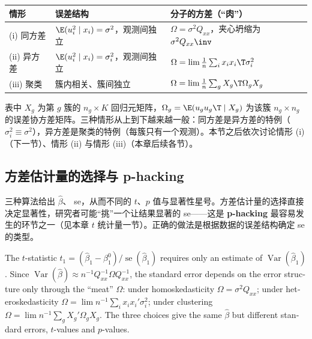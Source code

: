 \begin{center}
\small
\begin{tabularx}{\linewidth}{lLL}
\toprule
情形 & 误差结构 & 分子的方差（“肉”）\\
\midrule
(i) 同方差 & $\E(u_i^2\mid x_i)=\sigma^2$，观测间独立 & $\Omega=\sigma^2Q_{xx}$，夹心坍缩为 $\sigma^2Q_{xx}\inv$\\
(ii) 异方差 & $\E(u_i^2\mid x_i)=\sigma_i^2$，观测间独立 & $\Omega=\lim\frac1n\sum_i x_ix_i\T\sigma_i^2$\\
(iii) 聚类 & 簇内相关、簇间独立 & $\Omega=\lim\frac1n\sum_g X_g\T\Omega_gX_g$\\
\bottomrule
\end{tabularx}
\end{center}

表中 $X_g$ 为第 $g$ 簇的 $n_g\times K$ 回归元矩阵，$\Omega_g=\E(u_gu_g\T\mid X_g)$ 为该簇 $n_g\times n_g$ 的误差协方差矩阵。三种情形从上到下越来越一般：同方差是异方差的特例（$\sigma_i^2\equiv\sigma^2$），异方差是聚类的特例（每簇只有一个观测）。本节之后依次讨论情形 (i)（下一节）、情形 (ii) 与情形 (iii)（本章后续各节）。

\subsection{方差估计量的选择与 p-hacking}

三种算法给出 $\hat\beta$、 se，从而不同的 $t$、$p$ 值与显著性星号。方差估计量的选择直接决定显著性，研究者可能“挑”一个让结果显著的 se——这是 \textbf{p-hacking} 最容易发生的环节之一（见本章 $t$ 统计量一节）。正确的做法是根据数据的误差结构确定 se 的类型。

\begin{english}
The $t$-statistic $t_1=(\hat\beta_1-\beta_1^0)/\operatorname{se}(\hat\beta_1)$ requires only an estimate of $\operatorname{Var}(\hat\beta_1)$. Since $\operatorname{Var}(\hat\beta)\approx n^{-1}Q_{xx}^{-1}\Omega Q_{xx}^{-1}$, the standard error depends on the error structure only through the ``meat'' $\Omega$: under homoskedasticity $\Omega=\sigma^2Q_{xx}$; under heteroskedasticity $\Omega=\lim n^{-1}\sum_i x_ix_i'\sigma_i^2$; under clustering $\Omega=\lim n^{-1}\sum_g X_g'\Omega_gX_g$. The three choices give the same $\hat\beta$ but different standard errors, $t$-values and $p$-values.
\end{english}

